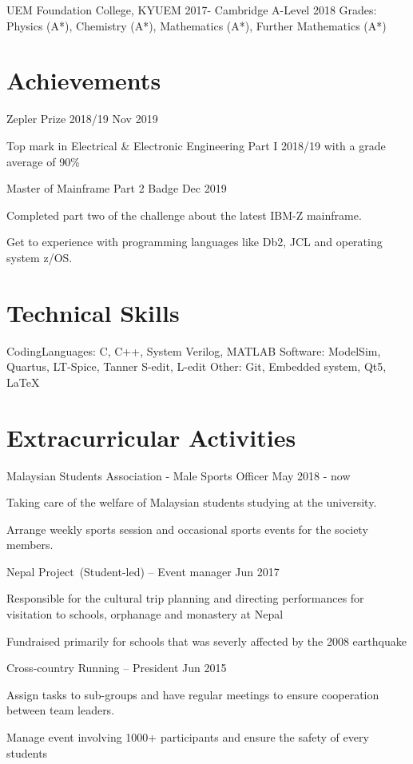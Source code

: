\documentclass{myresume2}
\begin{document}
\headEntry
  {UEM Foundation College, KYUEM}
  {2017-}
  {Cambridge A-Level}
  {2018}
\twocolumnEntry
  {Grades:}
  {Physics (A*), Chemistry (A*), Mathematics (A*), Further Mathematics (A*)}
%
%
%
%
\section{Achievements}
\simpleEntry
  {Zepler Prize 2018/19}
  {Nov 2019}
  {\item Top mark in Electrical \& Electronic Engineering Part I 2018/19 with a grade average of 90\%}

\simpleEntry
  {Master of Mainframe Part 2 Badge}
  {Dec 2019}
  {\item Completed part two of the challenge about the latest IBM-Z mainframe.
  \item Get to experience with programming languages like Db2, JCL and operating system z/OS.}
%
%
%
%
\section{Technical Skills}
\twocolumnEntry
  {Coding\newline Languages:}
  {C, C++, System Verilog, MATLAB}
\twocolumnEntry
  {Software:}
  {ModelSim, Quartus, LT-Spice, Tanner S-edit, L-edit}
\twocolumnEntry
  {Other:}
  {Git, Embedded system, Qt5, LaTeX}
%
%
%
%
\section{Extracurricular Activities}
%
\simpleEntry
  {Malaysian Students Association - Male Sports Officer}
  {May 2018 - now}
  {\item Taking care of the welfare of Malaysian students studying at the university.
  \item Arrange weekly sports session and occasional sports events for the society members.}

\simpleEntry
  {Nepal Project (Student-led) – Event manager}
  {Jun 2017}
  {\item Responsible for the cultural trip planning and directing performances for visitation to schools, orphanage and monastery at Nepal
  \item Fundraised primarily for schools that was severly affected by the 2008 earthquake}

\simpleEntry
  {Cross-country Running – President}
  {Jun 2015}
  {\item Assign tasks to sub-groups and have regular meetings to ensure cooperation between team leaders.
  \item Manage event involving 1000+ participants and ensure the safety of every students}
%
%
%
%
\end{document}
